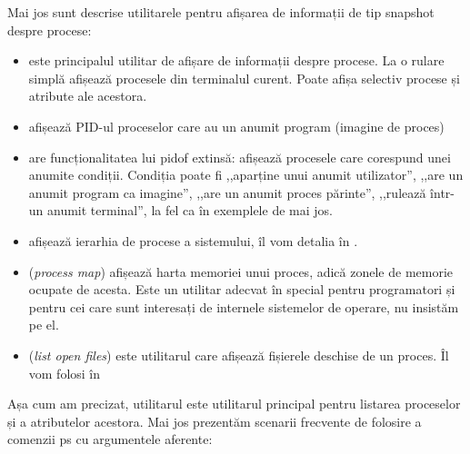 Mai jos sunt descrise utilitarele pentru afișarea de informații de tip snapshot
despre procese:

\begin{itemize}
  \item {} este principalul utilitar de afișare de informații despre
		procese. La o rulare simplă afișează procesele din terminalul
		curent. Poate afișa selectiv procese și atribute ale acestora.
  \item {} afișează PID-ul proceselor care au un anumit program
		(imagine de proces)
  \item {} are funcționalitatea lui pidof extinsă: afișează procesele
		care corespund unei anumite condiții. Condiția poate fi
		,,aparține unui anumit utilizator'', ,,are un anumit program ca
		imagine'', ,,are un anumit proces părinte'', ,,rulează într-un
		anumit terminal'', la fel ca în exemplele de mai jos.
  \item {} afișează ierarhia de procese a sistemului, îl vom detalia
		în .
  \item {} (\textit{process map}) afișează harta memoriei unui proces,
		adică zonele de memorie ocupate de acesta. Este un utilitar
		adecvat în special pentru programatori și pentru cei care sunt
		interesați de internele sistemelor de operare, nu insistăm pe
		el.
  \item {} (\textit{list open files}) este utilitarul care afișează
		fișierele deschise de un proces. Îl vom folosi în
\end{itemize}

Așa cum am precizat, utilitarul  este utilitarul principal pentru listarea
proceselor și a atributelor acestora. Mai jos prezentăm scenarii frecvente de
folosire a comenzii ps cu argumentele aferente:

